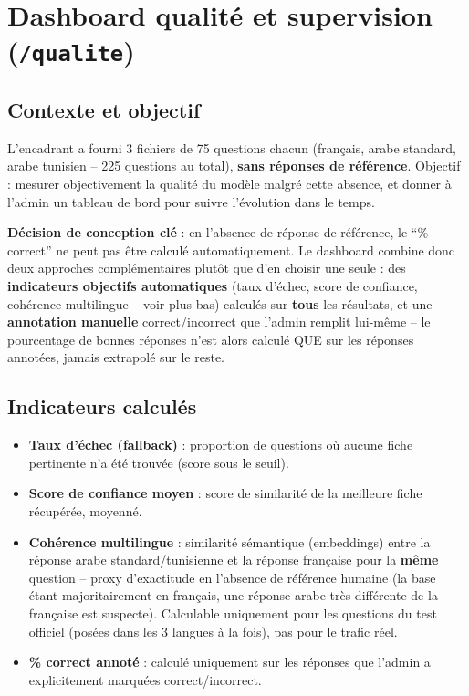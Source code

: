 \documentclass[11pt,a4paper]{report}
\begin{document}
\chapter{Dashboard qualité et supervision (\texttt{/qualite})}
\label{chap:qualite}

\section{Contexte et objectif}
L'encadrant a fourni 3 fichiers de 75 questions chacun (français, arabe standard, arabe
tunisien -- 225 questions au total), \textbf{sans réponses de référence}. Objectif :
mesurer objectivement la qualité du modèle malgré cette absence, et donner à l'admin un
tableau de bord pour suivre l'évolution dans le temps.

\begin{noteinfo}
\textbf{Décision de conception clé} : en l'absence de réponse de référence, le
``\% correct'' ne peut pas être calculé automatiquement. Le dashboard combine donc deux
approches complémentaires plutôt que d'en choisir une seule : des \textbf{indicateurs
objectifs automatiques} (taux d'échec, score de confiance, cohérence multilingue -- voir
plus bas) calculés sur \textbf{tous} les résultats, et une \textbf{annotation manuelle}
correct/incorrect que l'admin remplit lui-même -- le pourcentage de bonnes réponses n'est
alors calculé QUE sur les réponses annotées, jamais extrapolé sur le reste.
\end{noteinfo}

\section{Indicateurs calculés}
\begin{itemize}
    \item \textbf{Taux d'échec (fallback)} : proportion de questions où aucune fiche
    pertinente n'a été trouvée (score sous le seuil).
    \item \textbf{Score de confiance moyen} : score de similarité de la meilleure fiche
    récupérée, moyenné.
    \item \textbf{Cohérence multilingue} : similarité sémantique (embeddings) entre la
    réponse arabe standard/tunisienne et la réponse française pour la \textbf{même}
    question -- proxy d'exactitude en l'absence de référence humaine (la base étant
    majoritairement en français, une réponse arabe très différente de la française est
    suspecte). Calculable uniquement pour les questions du test officiel (posées dans les
    3 langues à la fois), pas pour le trafic réel.
    \item \textbf{\% correct annoté} : calculé uniquement sur les réponses que l'admin a
    explicitement marquées correct/incorrect.
\end{itemize}
\end{document}
